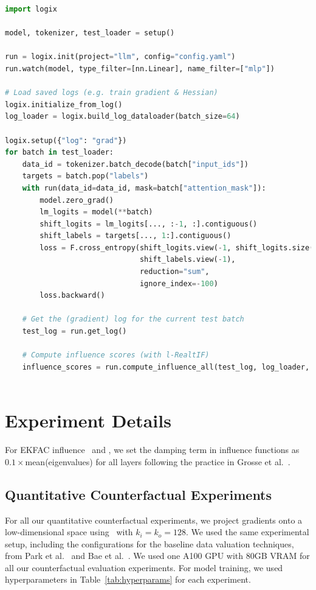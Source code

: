 \begin{lstlisting}[language=Python]
import logix

model, tokenizer, test_loader = setup()

run = logix.init(project="llm", config="config.yaml")
run.watch(model, type_filter=[nn.Linear], name_filter=["mlp"])

# Load saved logs (e.g. train gradient & Hessian)
logix.initialize_from_log()
log_loader = logix.build_log_dataloader(batch_size=64)

logix.setup({"log": "grad"})
for batch in test_loader:
    data_id = tokenizer.batch_decode(batch["input_ids"])
    targets = batch.pop("labels")
    with run(data_id=data_id, mask=batch["attention_mask"]):
        model.zero_grad()
        lm_logits = model(**batch)
        shift_logits = lm_logits[..., :-1, :].contiguous()
        shift_labels = targets[..., 1:].contiguous()
        loss = F.cross_entropy(shift_logits.view(-1, shift_logits.size(-1)),
                               shift_labels.view(-1),
                               reduction="sum",
                               ignore_index=-100)
        loss.backward()
        
    # Get the (gradient) log for the current test batch
    test_log = run.get_log()
    
    # Compute influence scores (with l-RealtIF)
    influence_scores = run.compute_influence_all(test_log, log_loader, mode="cosine")
    
\end{lstlisting}

\newpage
\section{Experiment Details}
\label{sec:hyperparams}

For EKFAC influence~\cite{grosse2023studying} and \method, we set the damping term in influence functions as $0.1\times$mean(eigenvalues) for all layers following the practice in Grosse et al.~\cite{grosse2023studying}.


\subsection{Quantitative Counterfactual Experiments}
For all our quantitative counterfactual experiments, we project gradients onto a low-dimensional space using \method\ with $k_i=k_o=128$. We used the same experimental setup, including the configurations for the baseline data valuation techniques, from Park et al.~\cite{park2023trak} and Bae et al.~\cite{bae2024training}. We used one A100 GPU with 80GB VRAM for all our counterfactual evaluation experiments. For model training, we used hyperparameters in Table~\ref{tab:hyperparams} for each experiment.

